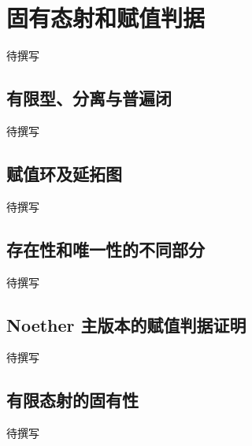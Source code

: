 
% 
% 

\section{固有态射和赋值判据}
\label{g5:sec:1202}

待撰写

\subsection{有限型、分离与普遍闭}
\label{g5:subsec:1202:01}
待撰写

\subsection{赋值环及延拓图}
\label{g5:subsec:1202:02}
待撰写

\subsection{存在性和唯一性的不同部分}
\label{g5:subsec:1202:03}
待撰写

\subsection{Noether 主版本的赋值判据证明}
\label{g5:subsec:1202:04}
待撰写

\subsection{有限态射的固有性}
\label{g5:subsec:1202:05}
待撰写
